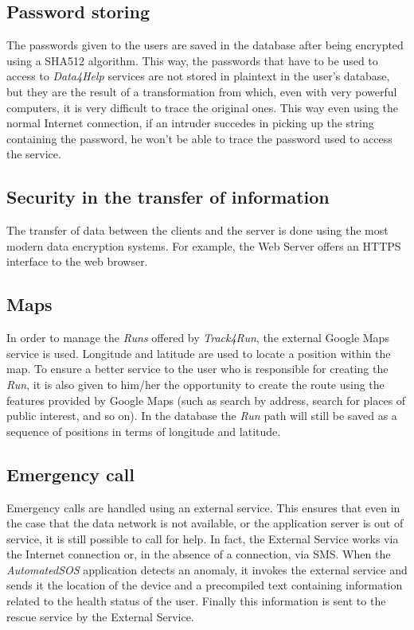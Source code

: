 \subsection{Password storing}
The passwords given to the users are saved in the database after being encrypted using a SHA512 algorithm.
This way, the passwords that have to be used to access to \textit{Data4Help} services are not stored in plaintext in the user's database, but they are the result of a transformation from which, even with very powerful computers, it is very difficult to trace the original ones.
This way even using the normal Internet connection, if an intruder succedes in picking up the string containing the password, he won't be able to trace the password used to access the service.

\subsection{Security in the transfer of information}
The transfer of data between the clients and the server is done using the most modern data encryption systems.
For example, the Web Server offers an HTTPS interface to the web browser.

\subsection{Maps}
In order to manage the \textit{Runs} offered by \textit{Track4Run}, the external Google Maps service is used.
Longitude and latitude are used to locate a position within the map.
To ensure a better service to the user who is responsible for creating the \textit{Run}, it is also given to him/her the opportunity to create the route using the features provided by Google Maps (such as search by address, search for places of public interest, and so on). In the database the \textit{Run} path will still be saved as a sequence of positions in terms of longitude and latitude.

\subsection{Emergency call}
Emergency calls are handled using an external service.
This ensures that even in the case that the data network is not available, or the application server is out of service, it is still possible to call for help.
In fact, the External Service works via the Internet connection or, in the absence of a connection, via SMS.
When the \textit{AutomatedSOS} application detects an anomaly, it invokes the external service and sends it the location of the device and a precompiled text containing information related to the health status of the user.
Finally this information is sent to the rescue service by the External Service.
